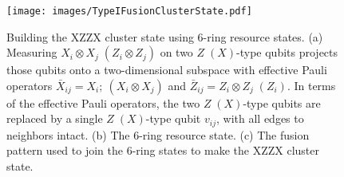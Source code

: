 \documentclass[reprint,
groupedaddress,
 prl,amsmath,amssymb,
 aps]{revtex4-2}
\theoremstyle{definition}
\begin{document}
\begin{bibunit}
\begin{figure}
    \centering
    \texttt{[image: images/TypeIFusionClusterState.pdf]}
    \caption{Building the XZZX cluster state using 6-ring resource states. (a) Measuring $X_i\otimes X_j\; (Z_i\otimes Z_j)$ on two $Z\; (X)$-type qubits projects those qubits onto a two-dimensional subspace with effective Pauli operators $\bar X_{ij} = X_i;\ (X_i\otimes X_j)$ and $\bar Z_{ij}=Z_i\otimes Z_j\; (Z_i)$. In terms of the effective Pauli operators, the two $Z\; (X)$-type qubits are replaced by a single $Z\; (X)$-type qubit $v_{ij}$, with all edges to neighbors intact. (b) The 6-ring resource state. (c) The fusion pattern used to join the 6-ring states to make the XZZX cluster state. }
    \label{fig:TypeIFusionClusterState}
\end{figure}




\end{bibunit}
\end{document}
